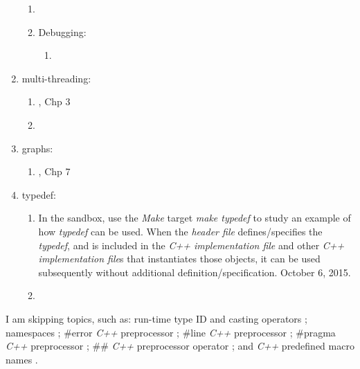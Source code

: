 \begin{enumerate}
\begin{enumerate}
	\item \cite[Chp. 4 and 7]{Romanik2003}
	\item Debugging: \vspace{-0.2cm}
		\begin{enumerate} \itemsep -2pt
		\item \cite[\S14.2]{Scheinerman2006}
		\end{enumerate}
	\end{enumerate}
\item multi-threading: \vspace{-0.3cm}
	\begin{enumerate} \itemsep -2pt
	\item \cite{Schildt2004a}, Chp 3
	\item \cite[\S5.1]{Romanik2003}
	\end{enumerate}
\item graphs: \vspace{-0.3cm}
	\begin{enumerate} \itemsep -2pt
	\item \cite{Schildt2004a}, Chp 7
	\end{enumerate}
\item typedef: \vspace{-0.3cm}
	\begin{enumerate} \itemsep -2pt
	\item In the sandbox, use the {\it Make} target {\it make typedef} to study an example of how {\it typedef} can be used. When the {\it header file} defines/specifies the {\it typedef}, and is included in the {\it C++ implementation file} and other {\it C++ implementation file}s that instantiates those objects, it can be used subsequently without additional definition/specification. October 6, 2015.
	\item \cite[pp. 510-512]{Savitch2009}
	\end{enumerate}
\end{enumerate}

	I am skipping topics, such as: run-time type ID and casting operators \cite[Chp. 19, pp. 451--470]{Schildt2003a}; namespaces \cite[pp. 472--480]{Schildt2003a}; \#error {\it C++} preprocessor \cite[pp. 552]{Schildt2003a}; \#line {\it C++} preprocessor \cite[pp. 558]{Schildt2003a}; \#pragma {\it C++} preprocessor \cite[pp. 559]{Schildt2003a}; \#\# {\it C++} preprocessor operator \cite[pp. 559--560]{Schildt2003a}; and {\it C++} predefined macro names \cite[pp. 560--561]{Schildt2003a}.






